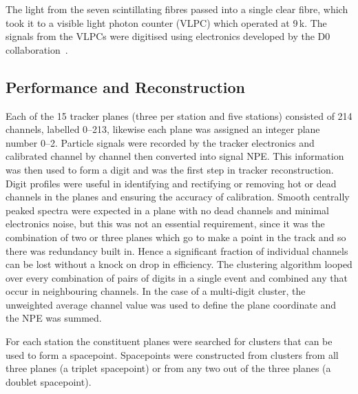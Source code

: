The light from the seven scintillating fibres passed into a single clear fibre, which took it to a visible light photon counter (VLPC) which operated at 9\,k. The signals from the VLPCs were digitised using electronics developed by the D0 collaboration~\cite{Abazov:2005pn}.


\subsection{Performance and Reconstruction}

Each of the 15 tracker planes (three per station and five stations) consisted of 214 channels, labelled 0--213, likewise each plane was assigned an integer plane number 0--2. Particle signals were recorded by the tracker electronics and calibrated channel by channel then converted into signal NPE. This information was then used to form a digit and was the first step in tracker reconstruction.
Digit profiles were useful in identifying and rectifying or removing hot or dead channels in the planes and ensuring the accuracy of calibration.  Smooth centrally peaked spectra were expected in a plane with no dead channels and minimal electronics noise, but this was not an essential requirement, since it was the combination of two or three planes which go to make a point in the track and so there was redundancy built in. Hence a significant fraction of individual channels can be lost without a knock on drop in efficiency. 
The clustering algorithm looped over every combination of pairs of digits in a single event and combined any that occur in neighbouring channels. In the case of a multi-digit cluster, the unweighted average channel value was used to define the plane coordinate and the NPE was summed.


For each station the constituent planes were searched for clusters that can be used to form a spacepoint.
Spacepoints were constructed from clusters from all three planes (a triplet spacepoint) or from any two out of the three planes (a doublet spacepoint).



